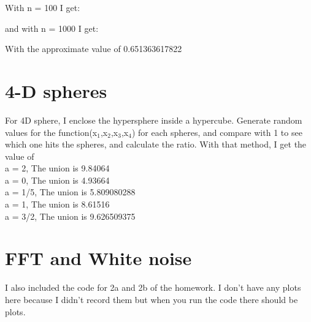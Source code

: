 \documentclass{article}
\begin{document}
With n = 100 I get:
\begin{figure}[H]
\end{figure}
and with n = 1000 I get:
\begin{figure}[H]
\end{figure}
With the approximate value of 0.651363617822

\section{4-D spheres}
For 4D sphere, I enclose the hypersphere inside a hypercube. Generate random values for the function(x$_1$,x$_2$,x$_3$,x$_4$) for each spheres, and compare with 1 to see which one hits the spheres, and calculate the ratio.
With that method, I get the value of \\
a = 2, The union is 9.84064 \\
a = 0, The union is 4.93664 \\
a = 1/5, The union is 5.809080288\\
a = 1, The union is 8.61516\\
a = 3/2, The union is 9.626509375

\section{FFT and White noise}
I also included the code for 2a and 2b of the homework. I don't have any plots here because I didn't record them but when you run the code there should be plots.
\end{document}
